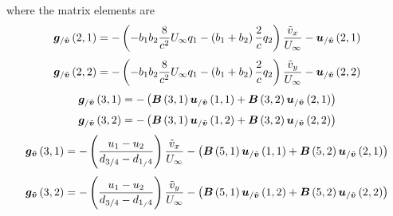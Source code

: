 where the matrix elements are
\begin{equation}
\bm{g}_{/\tilde{\bm{v}}}\left( 2,1 \right)  = 
-\left( -b_1 b_2 \frac{8}{c^2} U_\infty q_1 - \left( b_1+b_2 \right) \frac{2}{c} q_2 \right) \frac{\tilde{v}_x}{U_\infty} 
-\bm{u}_{/\tilde{\bm{v}}}\left( 2,1 \right)
\end{equation}
\begin{equation}
\bm{g}_{/\tilde{\bm{v}}}\left( 2,2 \right)  = 
-\left( -b_1 b_2 \frac{8}{c^2} U_\infty q_1 - \left( b_1+b_2 \right) \frac{2}{c} q_2 \right) \frac{\tilde{v}_y}{U_\infty} 
-\bm{u}_{/\tilde{\bm{v}}}\left( 2,2 \right)
\end{equation}
\begin{equation}
\bm{g}_{/\tilde{\bm{v}}}\left( 3,1 \right)  = -\left( \bm{B}\left( 3,1 \right)\bm{u}_{/\tilde{\bm{v}}}\left( 1,1 \right)+
					\bm{B}\left( 3,2 \right)\bm{u}_{/\tilde{\bm{v}}}\left( 2,1 \right) \right)
\end{equation}
\begin{equation}
\bm{g}_{/\tilde{\bm{v}}}\left( 3,2 \right)  = -\left( \bm{B}\left( 3,1 \right)\bm{u}_{/\tilde{\bm{v}}}\left( 1,2 \right)+
					\bm{B}\left( 3,2 \right)\bm{u}_{/\tilde{\bm{v}}}\left( 2,2 \right) \right)
\end{equation}
\begin{equation}
\bm{g}_{\tilde{\bm{v}}}\left( 3,1 \right)  = 
-\left(  \frac{u_1-u_2}{d_{3/4}-d_{1_/4}} \right) \frac{\tilde{v}_x}{U_\infty}
-\left( \bm{B}\left( 5,1 \right)\bm{u}_{/\tilde{\bm{v}}}\left( 1,1 \right)+
					\bm{B}\left( 5,2 \right)\bm{u}_{/\tilde{\bm{v}}}\left( 2,1 \right) \right)
\end{equation}
\begin{equation}
\bm{g}_{\tilde{\bm{v}}}\left( 3,2 \right)  = 
-\left(  \frac{u_1-u_2}{d_{3/4}-d_{1_/4}} \right) \frac{\tilde{v}_y}{U_\infty}
-\left( \bm{B}\left( 5,1 \right)\bm{u}_{/\tilde{\bm{v}}}\left( 1,2 \right)+
					\bm{B}\left( 5,2 \right)\bm{u}_{/\tilde{\bm{v}}}\left( 2,2 \right) \right)
\end{equation}

	
			


